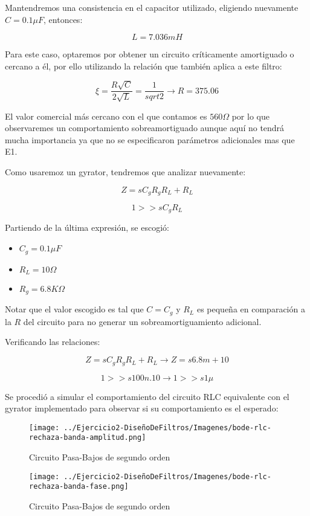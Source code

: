 Mantendremos una consistencia en el capacitor utilizado, eligiendo nuevamente $C=0.1 \mu F$, entonces:

$$L = 7.036 mH$$

Para este caso, optaremos por obtener un circuito críticamente amortiguado o cercano a él, por ello utilizando la relación que también aplica a este
filtro:

$$\xi=\frac{R \sqrt{C}}{2\sqrt{L}}=\frac{1}{sqrt{2}} \longrightarrow R=375.06$$

El valor comercial más cercano con el que contamos es $560 \Omega$ por lo que observaremes un comportamiento sobreamortiguado aunque aquí
no tendrá mucha importancia ya que no se especificaron parámetros adicionales mas que E1.

Como usaremoz un gyrator, tendremos que analizar nuevamente:

$$Z=sC_gR_gR_L+R_L$$

$$1 >> sC_gR_L$$

Partiendo de la última expresión, se escogió:

\begin{itemize}
	\item $C_g=0.1 \mu F$
	\item $R_L=10 \Omega$
	\item $R_g=6.8K \Omega$
\end{itemize}

Notar que el valor escogido es tal que $C=C_g$ y $R_L$ es pequeña en comparación a la $R$ del circuito para no generar
un sobreamortiguamiento adicional.

Verificando las relaciones:

$$Z=sC_gR_gR_L+R_L \longrightarrow Z = s6.8m + 10$$

$$1 >> s100n.10 \longrightarrow 1  >> s1\mu$$

Se procedió a simular el comportamiento del circuito RLC equivalente con el gyrator implementado para observar si su comportamiento es el esperado:


\begin{figure}[H]
    \centering
    \texttt{[image: ../Ejercicio2-DiseñoDeFiltros/Imagenes/bode-rlc-rechaza-banda-amplitud.png]}
    \caption{Circuito Pasa-Bajos de segundo orden}
\end{figure}

\begin{figure}[H]
    \centering
    \texttt{[image: ../Ejercicio2-DiseñoDeFiltros/Imagenes/bode-rlc-rechaza-banda-fase.png]}
    \caption{Circuito Pasa-Bajos de segundo orden}
\end{figure}


